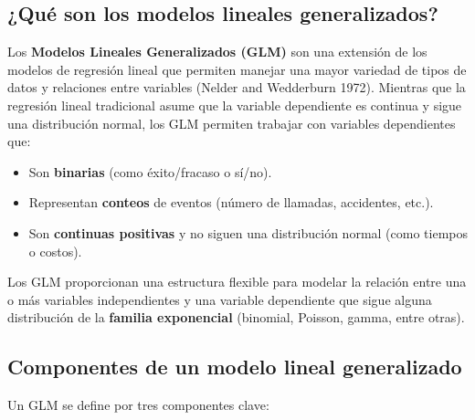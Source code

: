 \documentclass[
  letterpaper,
  DIV=11,
  numbers=noendperiod]{scrreprt}
\providecommand{\tightlist}{%
  \setlength{\itemsep}{0pt}\setlength{\parskip}{0pt}}
\begin{document}
\subsection{¿Qué son los modelos lineales
generalizados?}\label{quuxe9-son-los-modelos-lineales-generalizados}

Los \textbf{Modelos Lineales Generalizados (GLM)} son una extensión de
los modelos de regresión lineal que permiten manejar una mayor variedad
de tipos de datos y relaciones entre variables (Nelder and Wedderburn
1972). Mientras que la regresión lineal tradicional asume que la
variable dependiente es continua y sigue una distribución normal, los
GLM permiten trabajar con variables dependientes que:

\begin{itemize}
\tightlist
\item
  Son \textbf{binarias} (como éxito/fracaso o sí/no).
\item
  Representan \textbf{conteos} de eventos (número de llamadas,
  accidentes, etc.).
\item
  Son \textbf{continuas positivas} y no siguen una distribución normal
  (como tiempos o costos).
\end{itemize}

Los GLM proporcionan una estructura flexible para modelar la relación
entre una o más variables independientes y una variable dependiente que
sigue alguna distribución de la \textbf{familia exponencial} (binomial,
Poisson, gamma, entre otras).

\subsection{Componentes de un modelo lineal
generalizado}\label{componentes-de-un-modelo-lineal-generalizado}

Un GLM se define por tres componentes clave:
\end{document}
